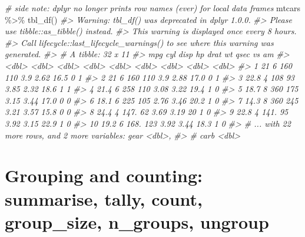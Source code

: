 \documentclass[
]{book}
\newenvironment{Shaded}{\begin{snugshade}}{\end{snugshade}}
\newcommand{\CommentTok}[1]{\textcolor[rgb]{0.56,0.35,0.01}{\textit{#1}}}
\newcommand{\FunctionTok}[1]{\textcolor[rgb]{0.00,0.00,0.00}{#1}}
\newcommand{\NormalTok}[1]{#1}
\newcommand{\SpecialCharTok}[1]{\textcolor[rgb]{0.00,0.00,0.00}{#1}}
\begin{document}
\begin{Shaded}
\begin{Highlighting}[]
\CommentTok{\# side note: dplyr no longer prints row names (ever) for local data frames}
\NormalTok{mtcars }\SpecialCharTok{\%\textgreater{}\%} \FunctionTok{tbl\_df}\NormalTok{()}
\CommentTok{\#\textgreater{} Warning: \textasciigrave{}tbl\_df()\textasciigrave{} was deprecated in dplyr 1.0.0.}
\CommentTok{\#\textgreater{} Please use \textasciigrave{}tibble::as\_tibble()\textasciigrave{} instead.}
\CommentTok{\#\textgreater{} This warning is displayed once every 8 hours.}
\CommentTok{\#\textgreater{} Call \textasciigrave{}lifecycle::last\_lifecycle\_warnings()\textasciigrave{} to see where this warning was generated.}
\CommentTok{\#\textgreater{} \# A tibble: 32 x 11}
\CommentTok{\#\textgreater{}      mpg   cyl  disp    hp  drat    wt  qsec    vs    am}
\CommentTok{\#\textgreater{}    \textless{}dbl\textgreater{} \textless{}dbl\textgreater{} \textless{}dbl\textgreater{} \textless{}dbl\textgreater{} \textless{}dbl\textgreater{} \textless{}dbl\textgreater{} \textless{}dbl\textgreater{} \textless{}dbl\textgreater{} \textless{}dbl\textgreater{}}
\CommentTok{\#\textgreater{}  1  21       6  160    110  3.9   2.62  16.5     0     1}
\CommentTok{\#\textgreater{}  2  21       6  160    110  3.9   2.88  17.0     0     1}
\CommentTok{\#\textgreater{}  3  22.8     4  108     93  3.85  2.32  18.6     1     1}
\CommentTok{\#\textgreater{}  4  21.4     6  258    110  3.08  3.22  19.4     1     0}
\CommentTok{\#\textgreater{}  5  18.7     8  360    175  3.15  3.44  17.0     0     0}
\CommentTok{\#\textgreater{}  6  18.1     6  225    105  2.76  3.46  20.2     1     0}
\CommentTok{\#\textgreater{}  7  14.3     8  360    245  3.21  3.57  15.8     0     0}
\CommentTok{\#\textgreater{}  8  24.4     4  147.    62  3.69  3.19  20       1     0}
\CommentTok{\#\textgreater{}  9  22.8     4  141.    95  3.92  3.15  22.9     1     0}
\CommentTok{\#\textgreater{} 10  19.2     6  168.   123  3.92  3.44  18.3     1     0}
\CommentTok{\#\textgreater{} \# ... with 22 more rows, and 2 more variables: gear \textless{}dbl\textgreater{},}
\CommentTok{\#\textgreater{} \#   carb \textless{}dbl\textgreater{}}
\end{Highlighting}
\end{Shaded}

\hypertarget{grouping-and-counting-summarise-tally-count-group_size-n_groups-ungroup}{%
\section{Grouping and counting: summarise, tally, count, group\_size, n\_groups, ungroup}\label{grouping-and-counting-summarise-tally-count-group_size-n_groups-ungroup}}
\end{document}
